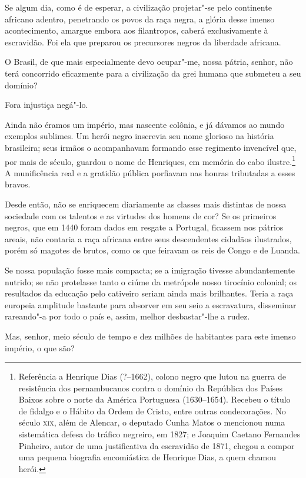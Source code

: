 Se algum dia, como é de esperar, a civilização projetar"-se pelo
continente africano adentro, penetrando os povos da raça negra, a
glória desse imenso acontecimento, amargue embora aos filantropos,
caberá exclusivamente à escravidão. Foi ela que preparou os precursores
negros da liberdade africana.

O Brasil, de que mais especialmente devo ocupar"-me, nossa pátria,
senhor, não terá concorrido eficazmente para a civilização da grei
humana que submeteu a seu domínio?

Fora injustiça negá"-lo.

Ainda não éramos um império, mas nascente colônia, e já dávamos ao mundo
exemplos sublimes. Um herói negro inscrevia seu nome glorioso na
história brasileira; seus irmãos o acompanhavam formando esse regimento
invencível que, por mais de século, guardou o nome de Henriques, em
memória do cabo
ilustre.\footnote{ Referência a Henrique Dias (?--1662), colono negro que lutou na 
guerra de resistência dos pernambucanos contra o domínio da República dos Países Baixos 
sobre o norte da América Portuguesa (1630--1654). Recebeu o título de fidalgo e o Hábito 
da Ordem de Cristo, entre outras condecorações. No século \textsc{xix}, além de Alencar, o deputado 
Cunha Matos o mencionou numa sistemática defesa do tráfico negreiro, em 1827; e Joaquim 
Caetano Fernandes Pinheiro, autor de uma justificativa da escravidão de 1871, chegou a 
compor uma pequena biografia encomiástica de Henrique Dias, a quem chamou herói.}
A munificência real e a gratidão pública porfiavam nas honras tributadas a esses bravos.

Desde então, não se enriquecem diariamente as classes mais distintas de
nossa sociedade com os talentos e as virtudes dos homens de cor? Se os
primeiros negros, que em 1440 foram dados em resgate a Portugal,
ficassem nos pátrios areais, não contaria a raça africana entre seus
descendentes cidadãos ilustrados, porém só magotes de brutos, como os
que feiravam os reis de Congo e de Luanda. 

Se nossa população fosse mais compacta; se a imigração tivesse
abundantemente nutrido; se não protelasse tanto o ciúme da metrópole
nosso tirocínio colonial; os resultados da educação pelo cativeiro
seriam ainda mais brilhantes. Teria a raça europeia amplitude bastante
para absorver em seu seio a escravatura, disseminar rareando"-a por
todo o país e, assim, melhor desbastar"-lhe a rudez. 

Mas, senhor, meio século de tempo e dez milhões de habitantes para este
imenso império, o que são?

